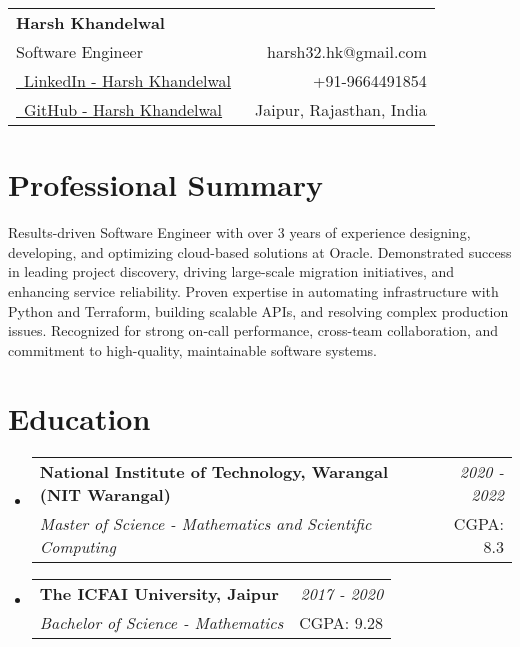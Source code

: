 \documentclass[a4paper,10pt]{article}
\makeatletter
\newcommand{\resumeSubheading}[4]{
\vspace{0.5mm}\item[]
    \begin{tabular*}{0.98\textwidth}[t]{l@{\extracolsep{\fill}}r}
        \textbf{#1} & \textit{\footnotesize{#4}} \\
        \textit{\footnotesize{#3}} &  \footnotesize{#2}\\
    \end{tabular*}
    \vspace{-1.0mm}
}
\newcommand{\resumeSubHeadingListStart}{\begin{itemize}[leftmargin=*,labelsep=0mm]}
\newcommand{\resumeSubHeadingListEnd}{\end{itemize}\vspace{2mm}}
\newcommand{\name}{Harsh Khandelwal} %
\newcommand{\phone}{9664491854} %
\newcommand{\emaila}{harsh32.hk@gmail.com} %
\makeatother
\begin{document}


\parbox{\dimexpr\linewidth-0.5cm\relax}{
\begin{tabularx}{\linewidth}{L r} \\
  \textbf{\Large \name}\\
  {Software Engineer} & \raisebox{0.0\height}{\footnotesize \faEnvelope}\ {\emaila} \\
  \href{https://www.linkedin.com/in/harsh-khandelwal-094866201/}{\raisebox{0.0\height}{\footnotesize \faLinkedin}\ LinkedIn - Harsh Khandelwal} &  {\raisebox{0.0\height}{\footnotesize \faPhone}\ +91-\phone} \\
  \href{https://github.com/redhlk}{\raisebox{0.0\height}{\footnotesize \faGithub}\ {GitHub - \name}}
  & {\raisebox{0.0\height}{\footnotesize}\ Jaipur, Rajasthan, India}\\
\end{tabularx}
}

\section{\textbf{Professional Summary}}
\resumeSubHeadingListStart
    {
        Results-driven Software Engineer with over 3 years of experience designing, developing, and optimizing cloud-based solutions at Oracle. Demonstrated success in leading project discovery, driving large-scale migration initiatives, and enhancing service reliability. Proven expertise in automating infrastructure with Python and Terraform, building scalable APIs, and resolving complex production issues. Recognized for strong on-call performance, cross-team collaboration, and commitment to high-quality, maintainable software systems.
    }
\resumeSubHeadingListEnd

\section{\textbf{Education}}
  \resumeSubHeadingListStart
    \resumeSubheading
      {National Institute of Technology, Warangal (NIT Warangal)}{CGPA: 8.3}
      {Master of Science - Mathematics and Scientific Computing }{2020 - 2022}
    \resumeSubheading
      {The ICFAI University, Jaipur}{CGPA: 9.28}
      {Bachelor of Science - Mathematics}{2017 - 2020}
  \resumeSubHeadingListEnd
\vspace{-5.5mm}
%
\end{document}
